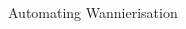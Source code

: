 \documentclass[xcolor=table,aspectratio=169]{beamer}
\numberwithin{equation}{section}
\begin{document}
\begin{frame}{Automating Wannierisation}
\begin{columns}
\begin{column}{0.5\textwidth}
\begin{overlayarea}{\columnwidth}{0.6\paperheight}
\begin{center}

\end{center}
\end{overlayarea}
\end{column}
\end{columns}
\end{frame}
\end{document}
